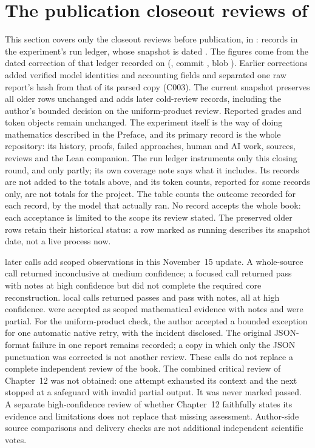 \section*{The publication closeout reviews of \aiCloseoutMonth}

This section covers only the closeout reviews before publication, in
\aiCloseoutMonth: \aiCloseoutRecords{} records in the experiment's run ledger,
whose snapshot is dated \aiCloseoutSnapshot. The figures come from the dated
correction of that ledger recorded on \aiCloseoutCorrection{}
(\aiCloseoutSource, commit \texttt{\aiCloseoutSourceCommit}, blob
\texttt{\aiCloseoutSourceBlob}). Earlier corrections added verified model
identities and accounting fields and separated one raw report's hash from
that of its parsed copy (C003). The current snapshot preserves all
\aiCloseoutHistoricalRecords{} older
rows unchanged and adds \aiCloseoutRecentRecords{} later cold-review records,
including the author's
bounded decision on the uniform-product review. Reported grades and token
objects remain unchanged. The experiment itself is the way of
doing mathematics described in the Preface, and its primary record is the whole
repository: its history, proofs, failed approaches, human and AI work, sources,
reviews and the Lean companion. The run ledger instruments only this closing
round, and only partly; its own coverage note says what it includes. Its
records are not added to the totals above, and its token counts, reported for
some records only, are not totals for the project. The table counts the outcome
recorded for each record, by the model that actually ran\aiCloseoutRunningNote.
No record accepts the whole book: each acceptance is limited to the scope its
review stated. The preserved older rows retain their historical status: a
row marked as running describes its snapshot date, not a live process now.

\aiCloseoutRecentWords{} later calls add scoped observations in this
November~15 update. A whole-source call returned inconclusive at medium
confidence;
a focused call returned pass with notes at high confidence but did not
complete the required core reconstruction. \aiCloseoutLocalWords{} local
calls returned \aiCloseoutLocalPassWords{} passes and
\aiCloseoutLocalNotesWords{} pass with notes, all at high confidence.
\aiCloseoutLocalAcceptedWords{} were accepted as scoped mathematical evidence
with notes and \aiCloseoutLocalPartialWords{} were partial. For the
uniform-product check, the author accepted a bounded
exception for one automatic native retry, with the incident disclosed. The
original JSON-format failure in one report remains recorded; a
copy in which only the JSON punctuation was corrected is not another review.
These calls do not replace a complete independent review of the book. The
combined critical review of Chapter~12 was not obtained: one attempt
exhausted its context and the next stopped at a safeguard with invalid partial
output. It was never marked passed. A separate high-confidence review of
whether Chapter~12 faithfully states its evidence and limitations does not
replace that missing assessment.
Author-side source comparisons and delivery checks are not additional
independent scientific votes.

